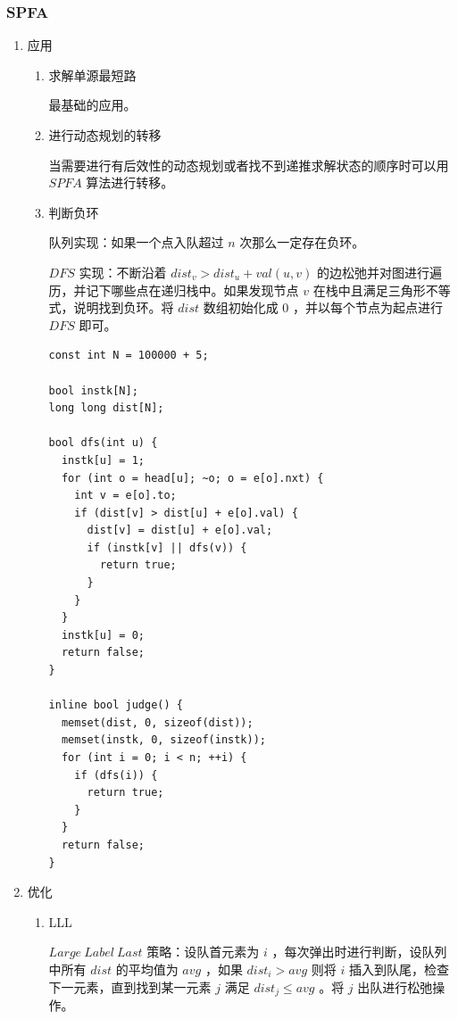 \documentclass[11pt]{article}
\begin{document}
\subsubsection{SPFA}
\label{sec-6-6-2}
\begin{enumerate}
\item 应用
\label{sec-6-6-2-1}

\begin{enumerate}
\item 求解单源最短路
\label{sec-6-6-2-1-1}

最基础的应用。

\item 进行动态规划的转移
\label{sec-6-6-2-1-2}

当需要进行有后效性的动态规划或者找不到递推求解状态的顺序时可以用 $SPFA$ 算法进行转移。

\item 判断负环
\label{sec-6-6-2-1-3}

队列实现：如果一个点入队超过 $n$ 次那么一定存在负环。

$DFS$ 实现：不断沿着 $dist_v>dist_u+val(u,v)$ 的边松弛并对图进行遍历，并记下哪些点在递归栈中。如果发现节点 $v$ 在栈中且满足三角形不等式，说明找到负环。将 $dist$ 数组初始化成 $0$ ，并以每个节点为起点进行 $DFS$ 即可。

\begin{verbatim}
const int N = 100000 + 5;

bool instk[N];
long long dist[N];

bool dfs(int u) {
  instk[u] = 1;
  for (int o = head[u]; ~o; o = e[o].nxt) {
    int v = e[o].to;
    if (dist[v] > dist[u] + e[o].val) {
      dist[v] = dist[u] + e[o].val;
      if (instk[v] || dfs(v)) {
        return true;
      }
    }
  }
  instk[u] = 0;
  return false;
}

inline bool judge() {
  memset(dist, 0, sizeof(dist));
  memset(instk, 0, sizeof(instk));
  for (int i = 0; i < n; ++i) {
    if (dfs(i)) {
      return true;
    }
  }
  return false;
}
\end{verbatim}
\end{enumerate}

\item 优化
\label{sec-6-6-2-2}
\begin{enumerate}
\item LLL
\label{sec-6-6-2-2-1}

$Large\ Label\ Last$ 策略：设队首元素为 $i$ ，每次弹出时进行判断，设队列中所有 $dist$ 的平均值为 $avg$ ，如果 $dist_i>avg$ 则将 $i$ 插入到队尾，检查下一元素，直到找到某一元素 $j$ 满足 $dist_j \leq avg$ 。将 $j$ 出队进行松弛操作。


\end{enumerate}
\end{enumerate}
\end{document}
